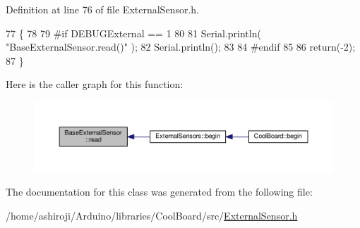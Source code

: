 Definition at line 76 of file External\+Sensor.\+h.


\begin{DoxyCode}
77     \{
78     
79 \textcolor{preprocessor}{    #if DEBUGExternal == 1 }
80 
81         Serial.println( \textcolor{stringliteral}{"BaseExternalSensor.read()"} );
82         Serial.println();
83     
84 \textcolor{preprocessor}{    #endif      }
85         
86         \textcolor{keywordflow}{return}(-2);
87     \}
\end{DoxyCode}
Here is the caller graph for this function\+:\nopagebreak
\begin{figure}[H]
\begin{center}
\leavevmode
\includegraphics[width=350pt]{d1/d68/class_base_external_sensor_a1564f16deacf57b51b9948ac29db4291_icgraph}
\end{center}
\end{figure}


The documentation for this class was generated from the following file\+:\begin{DoxyCompactItemize}
\item 
/home/ashiroji/\+Arduino/libraries/\+Cool\+Board/src/\hyperlink{_external_sensor_8h}{External\+Sensor.\+h}\end{DoxyCompactItemize}
